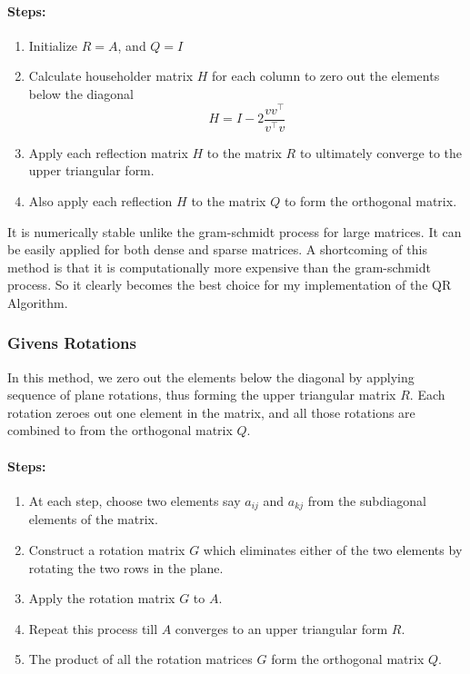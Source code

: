 \documentclass{article}
\begin{document}
\paragraph{Steps:}
\begin{enumerate}
    \item Initialize $R = A$, and $Q=I$
    \item Calculate householder matrix $H$ for each column to zero out the elements below the diagonal
    $$H = I - 2 \frac{v v^{\top}}{v^{\top}v}$$
    \item Apply each reflection matrix $H$ to the matrix $R$ to ultimately converge to the upper triangular form.
    \item Also apply each reflection $H$ to the matrix $Q$ to form the orthogonal matrix.
\end{enumerate}
It is numerically stable unlike the gram-schmidt process for large matrices. It can be easily applied for both dense and sparse matrices. A shortcoming of this method is that it is computationally more expensive than the gram-schmidt process. So it clearly becomes the best choice for my implementation of the QR Algorithm.


\subsubsection{Givens Rotations}
In this method, we zero out the elements below the diagonal by applying sequence of plane rotations, thus forming the upper triangular matrix $R$. Each rotation zeroes out one element in the matrix, and all those rotations are combined to from the orthogonal matrix $Q$.
\paragraph{Steps:}
\begin{enumerate}
    \item At each step, choose two elements say $a_{ij}$ and $a_{kj}$ from the subdiagonal elements of the matrix.
    \item Construct a rotation matrix $G$ which eliminates either of the two elements by rotating the two rows in the plane.
    \item Apply the rotation matrix $G$ to $A$. 
    \item Repeat this process till $A$ converges to an upper triangular form $R$.
    \item The product of all the rotation matrices $G$ form the orthogonal matrix $Q$.
    \end{enumerate}
\end{document}
